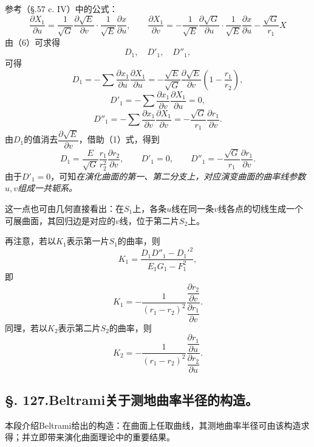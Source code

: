 参考（\S.57 c. IV）中的公式：
\begin{equation}\tag{10}
\frac{\partial X_1}{\partial u}=\frac1{\sqrt G}\frac{\partial\sqrt E}{\partial v}\cdot\frac1{\sqrt E}\frac{\partial x}{\partial u},
\qquad
\frac{\partial X_1}{\partial v}=-\frac1{\sqrt E}\frac{\partial\sqrt G}{\partial u}\cdot\frac1{\sqrt E}\frac{\partial x}{\partial u}-\frac{\sqrt G}{r_1}X
\end{equation}
由（6）可求得
\[
 D_1,
 \quad D'_1,
 \quad D''_1,
\]
可得
\[
 D_1=-\sum\frac{\partial x_1}{\partial u}\frac{\partial X_1}{\partial u}
 =-\frac{\sqrt E}{\sqrt G}\frac{\partial\sqrt E}{\partial v}\left(1-\frac{r_1}{r_2}\right),
\]
\[
 D'_1=-\sum\frac{\partial x_1}{\partial v}\frac{\partial X_1}{\partial u}=0,
\]
\[
 D''_1=-\sum\frac{\partial x_1}{\partial v}\frac{\partial X_1}{\partial v}
 =-\frac{\sqrt G}{r_1}\frac{\partial r_1}{\partial v}.
\]
由\(D_1\)的值消去\(\dfrac{\partial\sqrt E}{\partial v}\)，借助（1）式，得到
\begin{equation}\tag{11}
 D_1=\frac{E}{\sqrt G}\frac{r_1}{r_2^2}\frac{\partial r_2}{\partial v},
 \qquad
 D'_1=0,
 \qquad
 D''_1=-\frac{\sqrt G}{r_1}\frac{\partial r_1}{\partial v}.
\end{equation}
由于\(D'_1=0\)，可知\emph{在演化曲面的第一、第二分支上，对应演变曲面的曲率线参数\(u,v\)组成一共轭系。}

这一点也可由几何直接看出：在\(S_1\)上，各条\(u\)线在同一条\(v\)线各点的切线生成一个可展曲面，其回归边是对应的\(v\)线，位于第二片\(S_2\)上。

再注意，若以\(K_1\)表示第一片\(S_1\)的曲率，则
\[
 K_1=\frac{D_1D''_1-D_1'^2}{E_1G_1-F_1^2},
\]
即
\begin{equation}\tag{12}
 K_1=-\frac1{(r_1-r_2)^2}\frac{\dfrac{\partial r_2}{\partial v}}{\dfrac{\partial r_1}{\partial v}}.
\end{equation}
同理，若以\(K_2\)表示第二片\(S_2\)的曲率，则
\begin{equation}\tag{12*}
 K_2=-\frac1{(r_1-r_2)^2}\frac{\dfrac{\partial r_1}{\partial u}}{\dfrac{\partial r_2}{\partial u}}.
\end{equation}

\subsection*{\S. 127.\quad Beltrami关于测地曲率半径的构造。}

本段介绍Beltrami给出的构造：在曲面上任取曲线，其测地曲率半径可由该构造求得；并立即带来演化曲面理论中的重要结果。

